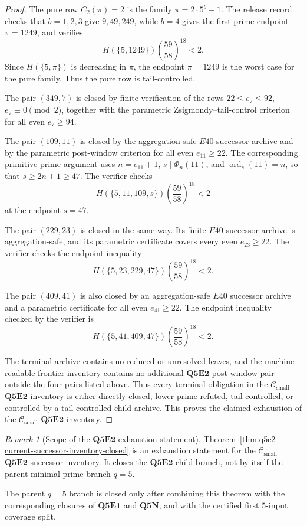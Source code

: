 \documentclass[11pt]{article}
\theoremstyle{definition}
\theoremstyle{remark}
\newtheorem{remark}[theorem]{Remark}
\newcommand{\Csmall}{\ensuremath{\mathcal C_{\mathrm{small}}}}
\begin{document}
\begin{proof}
The pure row \(C_2(\pi)=2\) is the family \(\pi=2\cdot5^b-1\).  The release
record checks that \(b=1,2,3\) give \(9,49,249\), while \(b=4\) gives the first
prime endpoint \(\pi=1249\), and verifies
\[
  H(\{5,1249\})
  \left(\frac{59}{58}\right)^{18}<2.
\]
Since \(H(\{5,\pi\})\) is decreasing in \(\pi\), the endpoint \(\pi=1249\) is
the worst case for the pure family.
Thus the pure row is tail-controlled.

The pair \((349,7)\) is closed by finite verification of the rows
\(22\le e_7\le92\), \(e_7\equiv0\pmod2\), together with the parametric
Zsigmondy--tail-control criterion for all even \(e_7\ge94\).

The pair \((109,11)\) is closed by the aggregation-safe \(E40\) successor
archive and by the parametric post-window criterion for all even
\(e_{11}\ge22\).  The corresponding primitive-prime argument uses
\(n=e_{11}+1\), \(s\mid\Phi_n(11)\), and \(\operatorname{ord}_s(11)=n\), so
that \(s\ge2n+1\ge47\).
The verifier checks
\[
  H(\{5,11,109,s\})
  \left(\frac{59}{58}\right)^{18}<2
\]
at the endpoint \(s=47\).

The pair \((229,23)\) is closed in the same way.  Its finite \(E40\) successor
archive is aggregation-safe, and its parametric certificate covers every even
\(e_{23}\ge22\).
The verifier checks the endpoint inequality
\[
  H(\{5,23,229,47\})
  \left(\frac{59}{58}\right)^{18}<2.
\]

The pair \((409,41)\) is also closed by an aggregation-safe \(E40\) successor
archive and a parametric certificate for all even \(e_{41}\ge22\).
The endpoint inequality checked by the verifier is
\[
  H(\{5,41,409,47\})
  \left(\frac{59}{58}\right)^{18}<2.
\]

The terminal archive contains no reduced or unresolved leaves, and the
machine-readable frontier inventory contains no additional \(\mathbf{Q5E2}\)
post-window pair outside the four pairs listed above.  Thus every terminal
obligation in the \(\Csmall\) \(\mathbf{Q5E2}\) inventory is either
directly closed, lower-prime refuted, tail-controlled, or controlled by a
tail-controlled child archive.  This proves the claimed exhaustion of the
\(\Csmall\) \(\mathbf{Q5E2}\) inventory.
\end{proof}

\begin{remark}[Scope of the \(\mathbf{Q5E2}\) exhaustion statement]
\label{rem:scope-q5e2-current-successor-inventory-closed}
Theorem~\ref{thm:q5e2-current-successor-inventory-closed} is an exhaustion
statement for the \(\Csmall\) \(\mathbf{Q5E2}\) successor inventory.  It
closes the \(\mathbf{Q5E2}\) child branch, not by itself the parent
minimal-prime branch \(q=5\).

The parent \(q=5\) branch is closed only after combining this theorem with the
corresponding closures of \(\mathbf{Q5E1}\) and \(\mathbf{Q5N}\), and with the
certified first \(5\)-input coverage split.
\end{remark}
\end{document}
